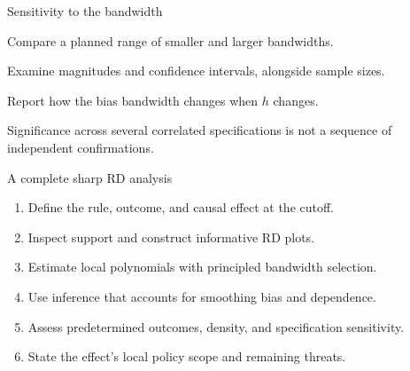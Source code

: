 \begin{frame}{Sensitivity to the bandwidth}
\begin{items}
\item Compare a planned range of smaller and larger bandwidths.
\item Examine magnitudes and confidence intervals, alongside sample sizes.
\item Report how the bias bandwidth changes when $h$ changes.
\item Significance across several correlated specifications is not a sequence of independent confirmations.
\end{items}
\end{frame}

\begin{frame}{A complete sharp RD analysis}
\begin{enumerate}\setlength{\itemsep}{.55em}
\item Define the rule, outcome, and causal effect at the cutoff.
\item Inspect support and construct informative RD plots.
\item Estimate local polynomials with principled bandwidth selection.
\item Use inference that accounts for smoothing bias and dependence.
\item Assess predetermined outcomes, density, and specification sensitivity.
\item State the effect's local policy scope and remaining threats.
\end{enumerate}
\end{frame}
